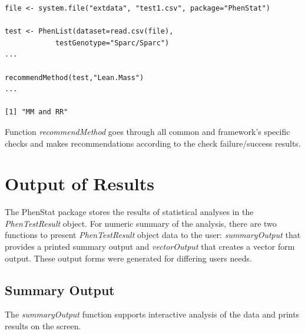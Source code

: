 \documentclass[12pt,a4paper]{article}
\begin{document}
\begingroup
\fontsize{8pt}{12pt}\selectfont
\begin{verbatim}
file <- system.file("extdata", "test1.csv", package="PhenStat")

test <- PhenList(dataset=read.csv(file),
            testGenotype="Sparc/Sparc")
...

recommendMethod(test,"Lean.Mass")
...

[1] "MM and RR"
\end{verbatim}
\endgroup

Function \textit{recommendMethod} goes through all common and framework's specific checks and makes recommendations according to the check failure/success results.  
\section{Output of Results}
\label{section:Results}
The PhenStat package stores the results of statistical analyses in the \textit{PhenTestResult} object.  
For numeric summary of the analysis, there are two functions to present \textit{PhenTestResult} object data to the user: 
\textit{summaryOutput} that provides a printed summary output and \textit{vectorOutput} that creates a vector form output. 
These output forms were generated for differing users needs. 

\subsection{Summary Output}
\label{SummaryOutput}
The \textit{summaryOutput} function supports interactive analysis of the data and prints results on the screen.
\end{document}
